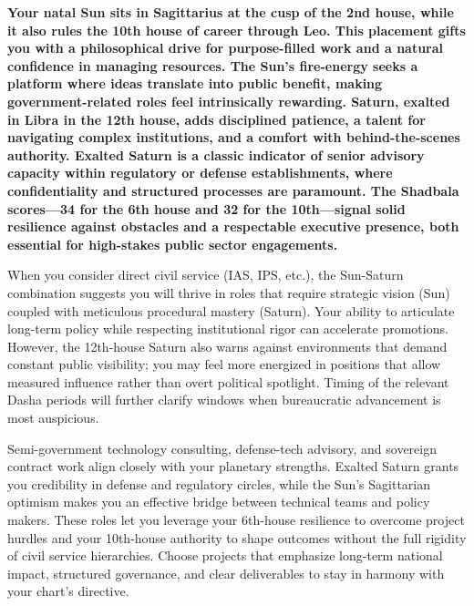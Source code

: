 {\fontsize{9.5}{13.8}\selectfont\bfseries\color{DeepSlate} Your natal Sun sits in Sagittarius at the cusp of the 2nd house, while it also rules the 10th house of career through Leo. This placement gifts you with a philosophical drive for purpose-filled work and a natural confidence in managing resources. The Sun's fire-energy seeks a platform where ideas translate into public benefit, making government-related roles feel intrinsically rewarding. Saturn, exalted in Libra in the 12th house, adds disciplined patience, a talent for navigating complex institutions, and a comfort with behind-the-scenes authority. Exalted Saturn is a classic indicator of senior advisory capacity within regulatory or defense establishments, where confidentiality and structured processes are paramount. The Shadbala scores---34 for the 6th house and 32 for the 10th---signal solid resilience against obstacles and a respectable executive presence, both essential for high-stakes public sector engagements.}\par\vspace{2mm}

{\fontsize{9}{13}\selectfont When you consider direct civil service (IAS, IPS, etc.), the Sun-Saturn combination suggests you will thrive in roles that require strategic vision (Sun) coupled with meticulous procedural mastery (Saturn). Your ability to articulate long-term policy while respecting institutional rigor can accelerate promotions. However, the 12th-house Saturn also warns against environments that demand constant public visibility; you may feel more energized in positions that allow measured influence rather than overt political spotlight. Timing of the relevant Dasha periods will further clarify windows when bureaucratic advancement is most auspicious.}\par\vspace{1.8mm}

{\fontsize{9}{13}\selectfont Semi-government technology consulting, defense-tech advisory, and sovereign contract work align closely with your planetary strengths. Exalted Saturn grants you credibility in defense and regulatory circles, while the Sun's Sagittarian optimism makes you an effective bridge between technical teams and policy makers. These roles let you leverage your 6th-house resilience to overcome project hurdles and your 10th-house authority to shape outcomes without the full rigidity of civil service hierarchies. Choose projects that emphasize long-term national impact, structured governance, and clear deliverables to stay in harmony with your chart's directive.}\par\vspace{1.8mm}

